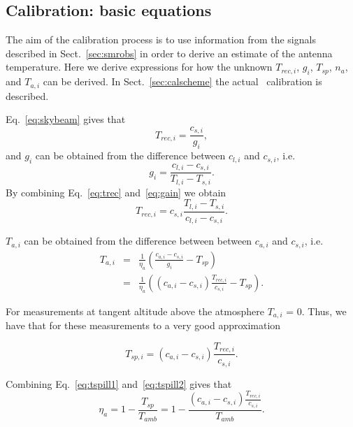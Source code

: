 \subsection{Calibration: basic equations}
\label{sec:caleq}
The aim of the calibration process is to use  
information from the signals described in Sect.~\ref{sec:smrobs}
in order to derive an estimate of the antenna temperature.
Here we derive expressions for how the unknown \(T_{rec,i}\),
\(g_{i}\), \(T_{sp}\), \(n_{a}\), and \(T_{a,i}\) can be derived.
In Sect.~\ref{sec:calscheme} the actual \smr\ calibration is described. 

Eq.~\ref{eq:skybeam} gives that
\begin{equation}
\label{eq:trec}
T_{rec,i}=\frac{c_{s,i}}{g_{i}},
\end{equation}
and \(g_{i}\) can be obtained from the difference between \(c_{l,i}\) and
 \(c_{s,i}\), i.e.
\begin{equation}
\label{eq:gain}
g_{i}=\frac{c_{l,i}-c_{s,i}}{T_{l,i}-T_{s,i}}.
\end{equation}
By combining Eq.~\ref{eq:trec} and~\ref{eq:gain} we obtain
\begin{equation}
\label{eq:trec2}
T_{rec,i}=c_{s,i}\frac{{T_{l,i}-T_{s,i}}}{c_{l,i}-c_{s,i}}.
\end{equation}

\(T_{a,i}\) can be obtained from the difference between between
\(c_{a,i}\) and \(c_{s,i}\), i.e.
\begin{eqnarray}
\label{eq:ta}
T_{a,i} &=& \frac{1}{\eta_{a}}\left(\frac{c_{a,i}-c_{s,i}}{g_{i}} - T_{sp}\right) \nonumber\\
 &=& \frac{1}{\eta_{a}}\left( \left(c_{a,i} - c_{s,i}\right)\frac{T_{rec,i}}{c_{s,i}} -T_{sp} \right). 
\end{eqnarray}

For measurements at tangent altitude above the atmosphere
\(T_{a,i}\) = 0. Thus, we have that for these measurements
to a very good approximation

\begin{equation}
\label{eq:tspill2}
T_{sp,i}= \left(c_{a,i}-c_{s,i}\right)\frac{T_{rec,i}}{c_{s,i}}.
\end{equation}

Combining Eq.~\ref{eq:tspill1} and~\ref{eq:tspill2} gives that
\begin{equation}
\label{eq:eta}
\eta_{a}=1-\frac{T_{sp}}{T_{amb}}=1-\frac{\left(c_{a,i}-c_{s,i}\right)\frac{T_{rec,i}}{c_{s,i}}}{T_{amb}}.
\end{equation}

